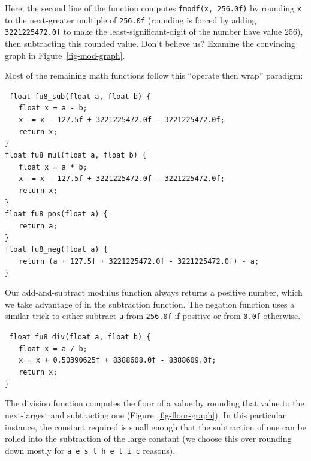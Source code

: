 \documentclass{acmsiggraph}
\theoremstyle{remark}
\theoremstyle{definition}
\begin{document}
Here, the second line of the function computes {\tt fmodf(x, 256.0f)} by rounding {\tt x} to the next-greater multiple of {\tt 256.0f} (rounding is forced by adding {\tt 3221225472.0f} to make the least-significant-digit of the number have value 256), then subtracting this rounded value.
Don't believe us? Examine the convincing graph in Figure~\ref{fig-mod-graph}.

Most of the remaining math functions follow this ``operate then wrap'' paradigm:

{\tt
float fu8\_sub(float a, float b) \{ \\
$\phantom{XX}$float x = a - b; \\
$\phantom{XX}$x -= x - 127.5f + 3221225472.0f - 3221225472.0f; \\
$\phantom{XX}$return x; \\
\} \\
float fu8\_mul(float a, float b) \{ \\
$\phantom{XX}$float x = a * b; \\
$\phantom{XX}$x -= x - 127.5f + 3221225472.0f - 3221225472.0f; \\
$\phantom{XX}$return x; \\
\} \\
float fu8\_pos(float a) \{ \\
$\phantom{XX}$return a; \\
\} \\
float fu8\_neg(float a) \{ \\
$\phantom{XX}$return (a + 127.5f + 3221225472.0f - 3221225472.0f) - a;\\
\} \\
}

Our add-and-subtract modulus function always returns a positive number, which we take advantage of in the subtraction function.
The negation function uses a similar trick to either subtract {\tt a} from {\tt 256.0f} if positive or from {\tt 0.0f} otherwise.


{\tt
float fu8\_div(float a, float b) \{ \\
$\phantom{XX}$float x = a / b; \\
$\phantom{XX}$x = x + 0.50390625f + 8388608.0f - 8388609.0f; \\
$\phantom{XX}$return x; \\
\}
}

The division function computes the floor of a value by rounding that value to the next-largest and subtracting one (Figure~\ref{fig-floor-graph}).
In this particular instance, the constant required is small enough that the subtraction of one can be rolled into the subtraction of the large constant (we choose this over rounding down mostly for {\tt a e s t h e t i c} reasons).
\end{document}
